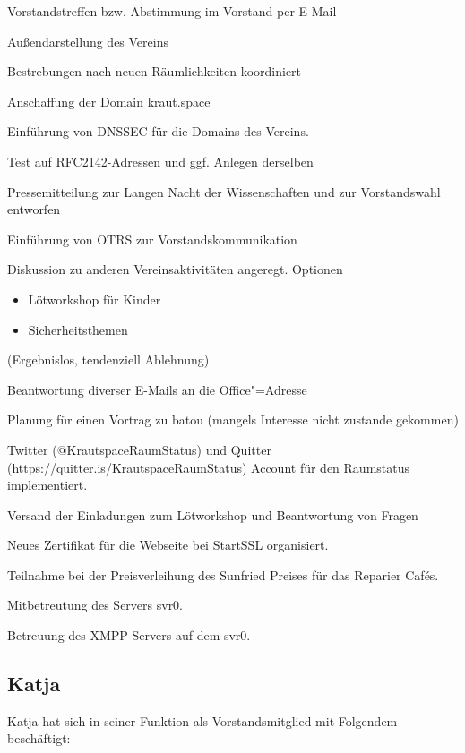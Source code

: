 \documentclass[ngerman]{scrartcl}
\begin{document}
\begin{compactitem}
\item Vorstandstreffen bzw. Abstimmung im Vorstand per E-Mail
\item Außendarstellung des Vereins
\item Bestrebungen nach neuen Räumlichkeiten koordiniert 
\item Anschaffung der Domain kraut.space
\item Einführung von DNSSEC für die Domains des Vereins.
\item Test auf RFC2142-Adressen und ggf. Anlegen derselben
\item Pressemitteilung zur Langen Nacht der Wissenschaften und zur
  Vorstandswahl entworfen
\item Einführung von OTRS zur Vorstandskommunikation
\item Diskussion zu anderen Vereinsaktivitäten angeregt. Optionen
  \begin{itemize}
  \item Lötworkshop für Kinder
  \item Sicherheitsthemen
  \end{itemize} (Ergebnislos, tendenziell Ablehnung)
\item Beantwortung diverser E-Mails an die Office"=Adresse
\item Planung für einen Vortrag zu batou (mangels Interesse nicht
  zustande gekommen)
\item Twitter (@KrautspaceRaumStatus) und Quitter
  (https://quitter.is/KrautspaceRaumStatus) Account für den Raumstatus
  implementiert.
\item Versand der Einladungen zum Lötworkshop und Beantwortung von
  Fragen
\item Neues Zertifikat für die Webseite bei StartSSL organisiert.
\item Teilnahme bei der Preisverleihung des Sunfried Preises für das Reparier Cafés.
\item Mitbetreutung des Servers svr0.
\item Betreuung des XMPP-Servers auf dem svr0.
\end{compactitem}

\subsection{Katja}

Katja hat sich in seiner Funktion als Vorstandsmitglied mit Folgendem 
beschäftigt:
\end{document}
